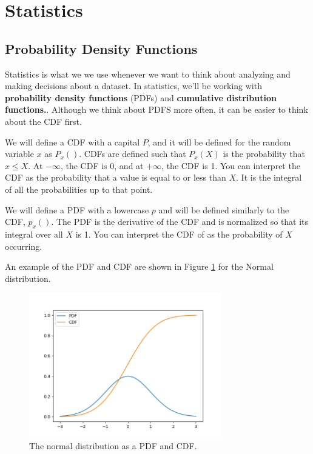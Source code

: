 \documentclass{article}
\begin{document}
\section{Statistics}
\subsection{Probability Density Functions}
Statistics is what we we use whenever we want to think about analyzing and making decisions about a dataset. In statistics, we'll be working with \textbf{probability density functions} (PDFs) and \textbf{cumulative distribution functions.}. Although we think about PDFS more often, it can be easier to think about the CDF first.

We will define a CDF with a capital $P$, and it will be defined for the random variable $x$ as $P_x()$. CDFs are defined such that $P_x(X)$ is the probability that $x \leq X$. At $-\infty$, the CDF is 0, and at $+\infty$, the CDF is 1. You can interpret the CDF as the probability that a value is equal to or less than $X$. It is the integral of all the probabilities up to that point. 

We will define a PDF with a lowercase $p$ and will be defined similarly to the CDF, $p_x()$. The PDF is the derivative of the CDF and is normalized so that its integral over all $X$ is 1. You can interpret the CDF of as the probability of $X$ occurring. 

An example of the PDF and CDF are shown in Figure \ref{fig:pdfvcdf} for the Normal distribution.

\begin{figure}[htbp]
\centerline{\includegraphics[width = 0.75\textwidth]{pdfvcdf.png}}
\caption[]{\label{fig:pdfvcdf} The normal distribution as a PDF and CDF.}
\end{figure}
\end{document}
